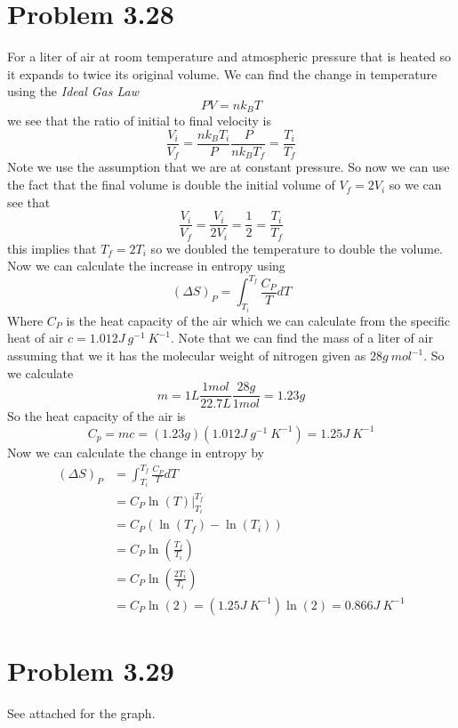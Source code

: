 \documentclass[11pt]{article}
\numberwithin{equation}{section}
\begin{document}


\section{Problem 3.28}
For a liter of air at room temperature and atmospheric pressure that is heated so it expands to twice its original volume. We can find the change in temperature using the \emph{Ideal Gas Law}
\begin{equation}
PV = nk_BT
\label{Ideal}
\end{equation}
we see that the ratio of initial to final velocity is
$$\frac{V_i}{V_f} = \frac{nk_BT_i}{P}\frac{P}{nk_BT_f} = \frac{T_i}{T_f}$$
Note we use the assumption that we are at constant pressure. So now we can use the fact that the final volume is double the initial volume of $V_f = 2V_i$ so we can see that
$$\frac{V_i}{V_f} = \frac{V_i}{2V_i} = \frac{1}{2} = \frac{T_i}{T_f}$$
this implies that $T_f = 2T_i$ so we doubled the temperature to double the volume. Now we can calculate the increase in entropy using
$$(\Delta S)_P = \int_{T_i}^{T_f}\frac{C_P}{T}dT$$
Where $C_P$ is the heat capacity of the air which we can calculate from the specific heat of air $c=1.012\unit{J\ g^{-1}\ K^{-1}}$. Note that we can find the mass of a liter of air assuming that we it has the molecular weight of nitrogen given as $28\unit{g\ mol^{-1}}$. So we calculate
$$m = 1\unit{L}\frac{1\unit{mol}}{22.7\unit{L}}\frac{28\unit{g}}{1\unit{mol}} = 1.23\unit{g}$$
So the heat capacity of the air is
$$C_p = mc = (1.23\unit{g})(1.012\unit{J\ g^{-1}\ K^{-1}}) = 1.25\unit{J\ K^{-1}}$$ 
Now we can calculate the change in entropy by
\begin{align*}
(\Delta S)_P &= \int_{T_i}^{T_f}\frac{C_P}{T}dT\\
&= \left.C_P\ln(T)\right|_{T_i}^{T_f}\\
&= C_P\left(\ln(T_f)-\ln(T_i)\right)\\
&= C_P\ln\left(\frac{T_f}{T_i}\right)\\
&= C_P\ln\left(\frac{2T_i}{T_i}\right)\\
&= C_P\ln(2) = (1.25\unit{J\ K^{-1}})\ln(2) = 0.866\unit{J\ K^{-1}}
\end{align*}

\section{Problem 3.29}
See attached for the graph.
\end{document}

